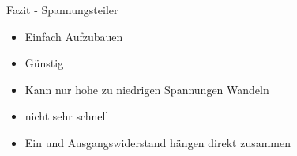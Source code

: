 
\begin{frame}[c]{Fazit - Spannungsteiler}

  \begin{itemize}
    \item Einfach Aufzubauen
    \item Günstig
    \item Kann nur hohe zu niedrigen Spannungen Wandeln
    \item nicht sehr schnell
    \item Ein und Ausgangswiderstand hängen direkt zusammen
  \end{itemize}

\end{frame}
